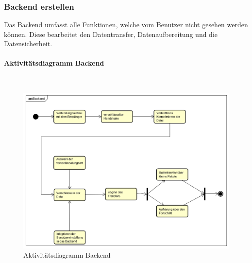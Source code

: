 \subsubsection{Backend erstellen}
Das Backend umfasst alle Funktionen, welche vom Benutzer nicht gesehen werden können. Diese bearbeitet den Datentransfer, Datenaufbereitung und die Datensicherheit.
\paragraph{Aktivitätsdiagramm Backend}\mbox{}\\
\begin{figure}[H]
	\centering
	\includegraphics[width= 0.9\linewidth]{diagramms/activity/Backend.png}
	\caption{Aktivitätsdiagramm Backend}
\end{figure}
\newpage
